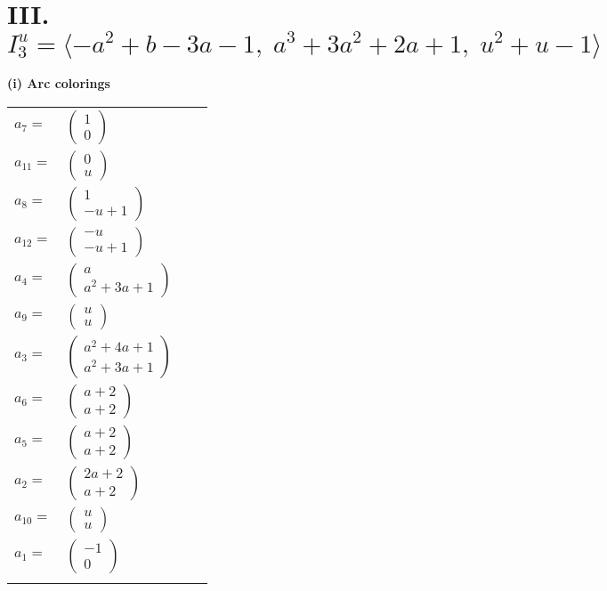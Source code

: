 \documentclass[1p]{elsarticle_modified}
\theoremstyle{definition}
\begin{document}
\centering \section*{III. $I^u_{3}= \langle - a^2+b-3 a-1,\;a^3+3 a^2+2 a+1,\;u^2+u-1 \rangle$}
\flushleft \textbf{(i) Arc colorings}\\
\begin{tabular}{m{7pt} m{180pt} m{7pt} m{180pt} }
\flushright $a_{7}=$&$\begin{pmatrix}1\\0\end{pmatrix}$ \\
\flushright $a_{11}=$&$\begin{pmatrix}0\\u\end{pmatrix}$ \\
\flushright $a_{8}=$&$\begin{pmatrix}1\\- u+1\end{pmatrix}$ \\
\flushright $a_{12}=$&$\begin{pmatrix}- u\\- u+1\end{pmatrix}$ \\
\flushright $a_{4}=$&$\begin{pmatrix}a\\a^2+3 a+1\end{pmatrix}$ \\
\flushright $a_{9}=$&$\begin{pmatrix}u\\u\end{pmatrix}$ \\
\flushright $a_{3}=$&$\begin{pmatrix}a^2+4 a+1\\a^2+3 a+1\end{pmatrix}$ \\
\flushright $a_{6}=$&$\begin{pmatrix}a+2\\a+2\end{pmatrix}$ \\
\flushright $a_{5}=$&$\begin{pmatrix}a+2\\a+2\end{pmatrix}$ \\
\flushright $a_{2}=$&$\begin{pmatrix}2 a+2\\a+2\end{pmatrix}$ \\
\flushright $a_{10}=$&$\begin{pmatrix}u\\u\end{pmatrix}$ \\
\flushright $a_{1}=$&$\begin{pmatrix}-1\\0\end{pmatrix}$\\&\end{tabular}
\end{document}
